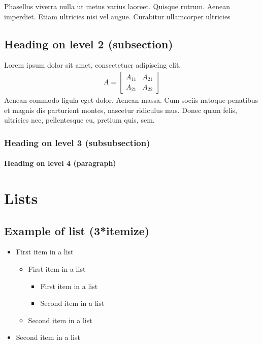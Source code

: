 \documentclass[paper=a4, fontsize=11pt]{scrartcl} %
\numberwithin{equation}{section} %
\numberwithin{figure}{section} %
\numberwithin{table}{section} %
\begin{document}
Phasellus viverra nulla ut metus varius laoreet. Quisque rutrum. Aenean imperdiet. Etiam ultricies nisi vel augue. Curabitur ullamcorper ultricies


\subsection{Heading on level 2 (subsection)}

Lorem ipsum dolor sit amet, consectetuer adipiscing elit. 
\begin{align}
A = 
\begin{bmatrix}
A_{11} & A_{21} \\
A_{21} & A_{22}
\end{bmatrix}
\end{align}
Aenean commodo ligula eget dolor. Aenean massa. Cum sociis natoque penatibus et magnis dis parturient montes, nascetur ridiculus mus. Donec quam felis, ultricies nec, pellentesque eu, pretium quis, sem.


\subsubsection{Heading on level 3 (subsubsection)}

\lipsum[3] %

\paragraph{Heading on level 4 (paragraph)}

\lipsum[6] %


\section{Lists}


\subsection{Example of list (3*itemize)}
\begin{itemize}
	\item First item in a list 
		\begin{itemize}
		\item First item in a list 
			\begin{itemize}
			\item First item in a list 
			\item Second item in a list 
			\end{itemize}
		\item Second item in a list 
		\end{itemize}
	\item Second item in a list 
\end{itemize}
\end{document}

